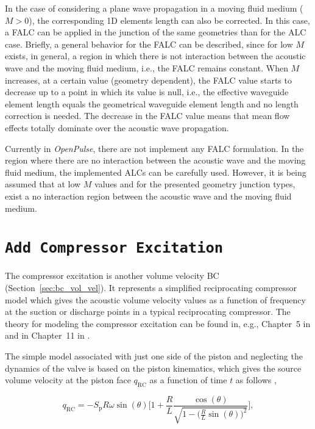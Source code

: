 \documentclass[12pt]{article}
\begin{document}
In the case of considering a plane wave propagation in a moving fluid medium ($M > 0$), the corresponding 1D elements length can also be corrected. In this case, a \acrshort{FALC} can be applied in the junction of the same geometries than for the \acrshort{ALC} case. Briefly, a general behavior for the \acrshort{FALC} can be described, since for low $M$ exists, in general, a region in which there is not interaction between the acoustic wave and the moving fluid medium, i.e., the \acrshort{FALC} remains constant. When $M$ increases, at a certain value (geometry dependent), the \acrshort{FALC} value starts to decrease up to a point in which its value is null, i.e., the effective waveguide element length equals the geometrical waveguide element length and no length correction is needed. The decrease in the \acrshort{FALC} value means that mean flow effects totally dominate over the acoustic wave propagation.

Currently in \textit{OpenPulse}, there are not implement any \acrshort{FALC} formulation. In the region where there are no interaction between the acoustic wave and the moving fluid medium, the implemented \acrshort{ALC}s can be carefully used. However, it is being assumed that at low $M$ values and for the presented geometry junction types, exist a no interaction region between the acoustic wave and the moving fluid medium.

\section{\texttt{Add Compressor Excitation}}

The compressor excitation is another volume velocity \acrshort{BC} (Section~\ref{sec:bc_vol_vel}). It represents a simplified reciprocating compressor model which gives the acoustic volume velocity values as a function of frequency at the suction or discharge points in a typical reciprocating compressor. The theory for modeling the compressor excitation can be found in, e.g., Chapter~5 in \cite[][]{fiv_kaneko} and in  Chapter~11 in \cite[][]{botros2018pipeline}. 

The simple model associated with just one side of the piston and neglecting the dynamics of the valve is based on the piston kinematics, which gives the source volume velocity at the piston face $q_\text{RC}$ as a function of time $t$ as follows \cite{botros2018pipeline}, 

\begin{equation} \label{eq:compressor_model}
q_\text{RC} = - S_\text{p} R \omega \sin(\theta) \Bigg[ 1 + \frac{R}{L} \frac{\cos(\theta)}{\sqrt{1 - \Big( \frac{R}{L} \sin(\theta) \Big)^2 }} \Bigg],
\end{equation}
\end{document}
